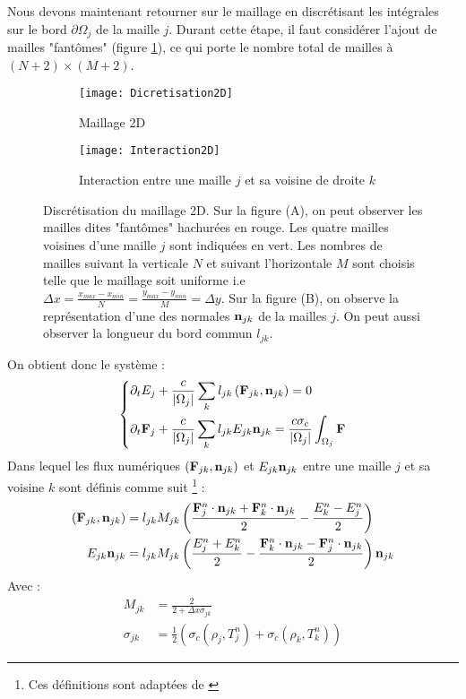 Nous devons maintenant retourner sur le maillage en discrétisant les intégrales sur le bord $\partial \Omega_j$ de la maille $j$. Durant cette étape, il faut considérer l'ajout de mailles "fantômes" (figure \ref{fig:Discretisation2D}), ce qui porte le nombre total de mailles à $(N+2) \times (M+2)$. 
\begin{figure}[!h]
\begin{subfigure}{.6\textwidth}
  \centering
  \texttt{[image: Dicretisation2D]}  
  \caption{Maillage 2D}
  \label{fig:Discretisation2D}
\end{subfigure}
\begin{subfigure}{.4\textwidth}
  \centering
  \texttt{[image: Interaction2D]}  
  \caption{Interaction entre une maille $j$ et sa voisine de droite $k$}
  \label{fig:Interaction2D}
\end{subfigure}

\centering
\decoRule
\caption{Discrétisation du maillage 2D. Sur la figure (A), on peut observer les mailles dites "fantômes" hachurées en rouge. Les quatre mailles voisines d'une maille $j$ sont indiquées en vert. Les nombres de mailles suivant la verticale $N$ et suivant l'horizontale $M$ sont choisis telle que le maillage soit uniforme i.e $\Delta x = \frac{x_{max}-x_{min}}{N} = \frac{y_{max}-y_{min}}{M} = \Delta y$. Sur la figure (B), on observe la représentation d'une des normales $\mathbf{n}_{jk}$ de la mailles $j$. On peut aussi observer la longueur du bord commun $l_{jk}.$}
\label{fig:2DMesh}
\end{figure}

\noindent On obtient donc le système :
\begin{equation*} 
    \begin{dcases}
    \partial_t E_j + \frac{c}{\left|\Omega_j\right|} \sum_k l_{jk}\left( \mathbf{F}_{jk}, \mathbf{n}_{jk} \right) = 0\\
    \partial_t \mathbf{F}_j + \frac{c}{\left|\Omega_j\right|} \sum_k l_{jk} E_{jk} \mathbf{n}_{jk} = \frac{c \sigma_c}{\left|\Omega_j\right|} \int_{\Omega_j} \mathbf{F}
    \end{dcases}   
\label{eqn:VolFin}
\end{equation*}
Dans lequel les flux numériques $\left( \mathbf{F}_{jk}, \mathbf{n}_{jk} \right)$ et $E_{jk} \mathbf{n}_{jk}$ entre une maille $j$ et sa voisine $k$ sont définis comme suit \footnote{Ces définitions sont adaptées de \parencite[161]{Reference2}} :
\begin{align*}
 \left(\mathbf{F}_{jk}, \mathbf{n}_{jk} \right) &= l_{jk} M_{jk} \left( \frac{\mathbf{F}_j^n \cdot \mathbf{n}_{jk} + \mathbf{F}_k^n \cdot \mathbf{n}_{jk}}{2} - \frac{E_k^n - E_j^n}{2} \right) \\
 E_{jk} \mathbf{n}_{jk} &= l_{jk} M_{jk} \left( \frac{E_j^n + E_k^n}{2} - \frac{\mathbf{F}_k^n \cdot \mathbf{n}_{jk} - \mathbf{F}_j^n \cdot \mathbf{n}_{jk}}{2} \right) \mathbf{n}_{jk} \\
\end{align*}
Avec :
\begin{align*}
 M_{jk} &= \frac{2}{2 + \Delta x \sigma_{jk}}  \\
 \sigma_{jk} &= \frac{1}{2} \left( \sigma_c(\rho_j,T_j^n) + \sigma_c(\rho_k,T_k^n) \right)
\end{align*}

